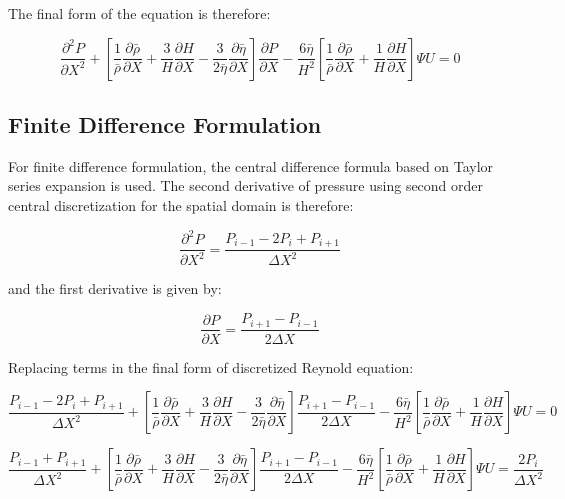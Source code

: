 The final form of the equation is therefore:

\begin{equation}\label{eq3.14}
	\frac{\partial^{2} P}{\partial X^{2}}+\left[\frac{1}{\bar{\rho}} \frac{\partial \bar{\rho}}{\partial X}+\frac{3}{H} \frac{\partial H}{\partial X}-\frac{3}{2 \bar{\eta}} \frac{\partial \bar{\eta}}{\partial X}\right] \frac{\partial P}{\partial X}-\frac{6 \bar{\eta}}{H^{2}}\left[\frac{1}{\bar{\rho}} \frac{\partial \bar{\rho}}{\partial X}+\frac{1}{H} \frac{\partial H}{\partial X}\right] \Psi U=0
\end{equation}

\subsection{Finite Difference Formulation} \label{Finite Difference Formulation}

For finite difference formulation, the central difference formula based on Taylor series expansion \cite{Hoffmann2000} is used. The second derivative of pressure using second order central discretization for the spatial domain is therefore:

\begin{equation}\label{eq3.15}
	\frac{\partial^2 P}{\partial X^2}=\frac{P_{i-1}-2 P_i+P_{i+1}}{\Delta X^2}
\end{equation}

and the first derivative is given by:

\begin{equation}\label{eq3.16}
	\frac{\partial P}{\partial X}=\frac{P_{i+1}-P_{i-1}}{2 \Delta X}
\end{equation}

Replacing terms in the final form of discretized Reynold equation:

\begin{equation}\label{eq3.17}
	\frac{P_{i-1}-2 P_i+P_{i+1}}{\Delta X^2}+\left[\frac{1}{\bar{\rho}} \frac{\partial \bar{\rho}}{\partial X}+\frac{3}{H} \frac{\partial H}{\partial X}-\frac{3}{2 \bar{\eta}} \frac{\partial \bar{\eta}}{\partial X}\right] \frac{P_{i+1}-P_{i-1}}{2 \Delta X}-\frac{6 \bar{\eta}}{H^2}\left[\frac{1}{\bar{\rho}} \frac{\partial \bar{\rho}}{\partial X}+\frac{1}{H} \frac{\partial H}{\partial X}\right] \Psi U=0
\end{equation}

\begin{equation}\label{eq3.18}
	\frac{P_{i-1}+P_{i+1}}{\Delta X^2}+\left[\frac{1}{\bar{\rho}} \frac{\partial \bar{\rho}}{\partial X}+\frac{3}{H} \frac{\partial H}{\partial X}-\frac{3}{2 \bar{\eta}} \frac{\partial \bar{\eta}}{\partial X}\right] \frac{P_{i+1}-P_{i-1}}{2 \Delta X}-\frac{6 \bar{\eta}}{H^2}\left[\frac{1}{\bar{\rho}} \frac{\partial \bar{\rho}}{\partial X}+\frac{1}{H} \frac{\partial H}{\partial X}\right] \Psi U=\frac{2 P_i}{\Delta X^2}
\end{equation}

